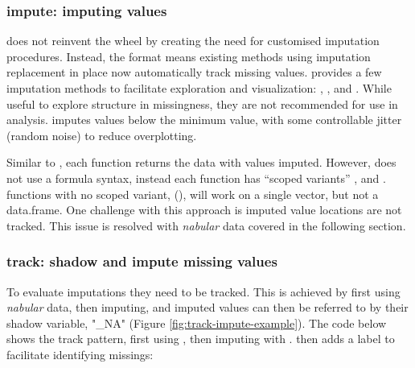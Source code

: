 \documentclass[
]{jss}
\begin{document}
\hypertarget{verbs-impute}{%
\subsubsection{impute: imputing values}\label{verbs-impute}}

 does not reinvent the wheel by creating the need for customised imputation procedures. Instead, the  format means existing methods using imputation replacement in place now automatically track missing values.  provides a few imputation methods to facilitate exploration and visualization: , , and . While useful to explore structure in missingness, they are not recommended for use in analysis.  imputes values below the minimum value, with some controllable jitter (random noise) to reduce overplotting.

Similar to , each  function returns the data with values imputed. However,  does not use a formula syntax, instead each function has ``scoped variants'' ,  and .  functions with no scoped variant, (), will work on a single vector, but not a data.frame. One challenge with this approach is imputed value locations are not tracked. This issue is resolved with \emph{nabular} data covered in the following section.

\hypertarget{verbs-track}{%
\subsubsection{track: shadow and impute missing values}\label{verbs-track}}

To evaluate imputations they need to be tracked. This is achieved by first using \emph{nabular} data, then imputing, and imputed values can then be referred to by their shadow variable, "\_NA" (Figure \ref{fig:track-impute-example}). The code below shows the track pattern, first using , then imputing with .  then adds a label to facilitate identifying missings:
\end{document}

